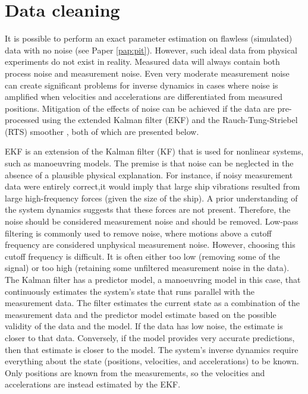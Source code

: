 \section{Data cleaning}
\label{sec:datacleaning}
It is possible to perform an exact parameter estimation on flawless (simulated) data with no noise (see Paper \ref{pap:pit}). However, such ideal data from physical experiments do not exist in reality. Measured data will always contain both process noise and measurement noise. Even very moderate measurement noise can create significant problems for inverse dynamics in cases where noise is amplified when velocities and accelerations are differentiated from measured positions.
Mitigation of the effects of noise can be achieved if the data are pre-processed using the extended Kalman filter (EKF) \cite{brownIntroductionRandomSignals1997} and the Rauch-Tung-Striebel (RTS) smoother \cite{rauchMaximumLikelihoodEstimates1965}, both of which are presented below.

EKF is an extension of the Kalman filter (KF) that is used for nonlinear systems, such as manoeuvring models. The premise is that noise can be neglected in the absence of a plausible physical explanation. For instance, if noisy measurement data were entirely correct,it would imply that large ship vibrations resulted from large high-frequency forces (given the size of the ship). A prior understanding of the system dynamics suggests that these forces are not present. Therefore, the noise should be considered measurement noise and should be removed. Low-pass filtering is commonly used to remove noise, where motions above a cutoff frequency are considered unphysical measurement noise. However, choosing this cutoff frequency is difficult. It is often  either too low (removing some of the signal) or too high (retaining some unfiltered measurement noise in the data). The Kalman filter has a predictor model, a manoeuvring model in this case, that continuously estimates the system’s state that runs parallel with the measurement data. The filter estimates the current state as a combination of the measurement data and the predictor model estimate based on the possible validity of the data and the model. If the data has low noise, the estimate is closer to that data. Conversely, if the model provides very accurate predictions, then that estimate is closer to the model.
The system’s inverse dynamics require everything about the state (positions, velocities, and accelerations) to be known. Only positions are known from the measurements, so the velocities and accelerations are instead estimated by the EKF.

